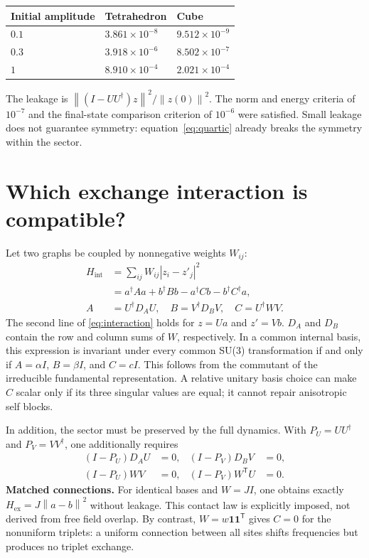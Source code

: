 \documentclass[a4paper,11pt]{article}
\newcommand{\norm}[1]{\left\lVert#1\right\rVert}
\newenvironment{drafttable}{\begin{center}\small\renewcommand{\arraystretch}{1.2}}{\end{center}}
\begin{document}
\begin{drafttable}
\begin{tabular}{@{}lll@{}}\toprule
Initial amplitude & Tetrahedron & Cube\\\midrule
$0.1$ & $3.861\times10^{-8}$ & $9.512\times10^{-9}$\\
$0.3$ & $3.918\times10^{-6}$ & $8.502\times10^{-7}$\\
$1$ & $8.910\times10^{-4}$ & $2.021\times10^{-4}$\\\bottomrule
\end{tabular}
\end{drafttable}
The leakage is $\norm{(I-UU^\dagger)z}^2/\norm{z(0)}^2$. The norm and energy criteria of $10^{-7}$ and the final-state comparison criterion of $10^{-6}$ were satisfied. Small leakage does not guarantee symmetry: equation~\eqref{eq:quartic} already breaks the symmetry within the sector.

\section{Which exchange interaction is compatible?}\label{sec:exchange}
Let two graphs be coupled by nonnegative weights $W_{ij}$:
\begin{equation}\label{eq:interaction}
\begin{aligned}
H_{\mathrm{int}}&=\sum_{ij}W_{ij}|z_i-z'_j|^2\\
&=a^\dagger Aa+b^\dagger Bb-a^\dagger Cb-b^\dagger C^\dagger a,\\
A&=U^\dagger D_AU,\quad B=V^\dagger D_BV,\quad C=U^\dagger WV.
\end{aligned}
\end{equation}
The second line of \eqref{eq:interaction} holds for $z=Ua$ and $z'=Vb$. $D_A$ and $D_B$ contain the row and column sums of $W$, respectively. In a common internal basis, this expression is invariant under every common SU(3) transformation if and only if $A=\alpha I$, $B=\beta I$, and $C=cI$. This follows from the commutant of the irreducible fundamental representation. A relative unitary basis choice can make $C$ scalar only if its three singular values are equal; it cannot repair anisotropic self blocks.

In addition, the sector must be preserved by the full dynamics. With $P_U=UU^\dagger$ and $P_V=VV^\dagger$, one additionally requires
\begin{equation}\label{eq:invariance}
\begin{aligned}
(I-P_U)D_AU&=0,&(I-P_V)D_BV&=0,\\
(I-P_U)WV&=0,&(I-P_V)W^\mathsf TU&=0.
\end{aligned}
\end{equation}
\textbf{Matched connections.} For identical bases and $W=JI$, one obtains exactly $H_{\mathrm{ex}}=J\norm{a-b}^2$ without leakage. This contact law is explicitly imposed, not derived from free field overlap. By contrast, $W=w\boldsymbol1\boldsymbol1^\mathsf T$ gives $C=0$ for the nonuniform triplets: a uniform connection between all sites shifts frequencies but produces no triplet exchange.
\end{document}
